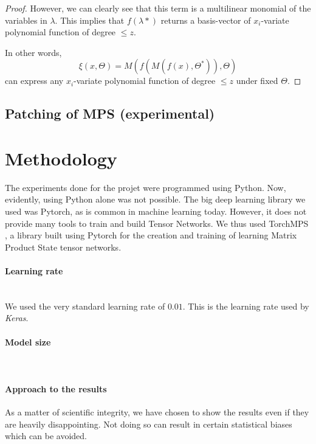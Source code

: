 \documentclass[11pt]{article}
\theoremstyle{definition}
\theoremstyle{definition}
\begin{document}
\begin{proof}
However, we can clearly see that this term is a multilinear 
monomial of the variables in $\lambda$. This implies that
$f(\lambda*)$ returns a basis-vector of $x_i$-variate polynomial 
function of degree $\leq z$.

In other words, 
\begin{equation}
    \xi \left( x, \Theta \right) =
        M
        \left(
            f
            \left(
                M
                \left(
                    f
                    \left(
                        x 
                    \right),
                    \Theta^*
                \right)
            \right),
            \Theta
        \right)
\end{equation}
can express any $x_i$-variate polynomial function of degree $\leq z$ under
fixed $\Theta$.

\end{proof}

\subsection{Patching of MPS (experimental)}






\section{Methodology}
The experiments done for the projet were programmed using Python. 
Now, evidently, using Python alone was not possible. The big 
deep learning library we used was Pytorch, as is common in machine learning today.
However, it does not provide many tools to train and build Tensor Networks. 
We thus used TorchMPS \cite{torchmps}, a library built using Pytorch for the creation 
and training of learning Matrix Product State tensor networks.

\paragraph{Learning rate} ${}$ \\
We used the very standard learning rate of $0.01$. This is the learning rate
used by {\it Keras}.

\paragraph{Model size} ${}$ \\

\paragraph{Approach to the results}
As a matter of scientific integrity, we have chosen to show the 
results even if they are heavily disappointing. Not doing so 
can result in certain statistical biases which can be avoided.
\end{document}
